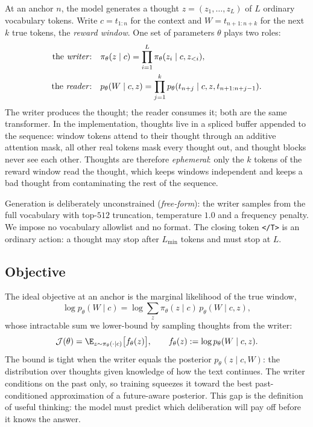 \documentclass{article} %
\newcommand{\ctx}{c}
\newcommand{\win}{W}
\newcommand{\thought}{z}
\newcommand{\policy}{\pi_\theta}
\newcommand{\reader}{p_\theta}
\newcommand{\tend}{\texttt{</T>}}
\begin{document}
At an anchor $n$, the model generates a thought $\thought = (\thought_1, \dots, \thought_L)$ of $L$ ordinary vocabulary tokens. Write $\ctx = t_{1:n}$ for the context and $\win = t_{n+1:n+k}$ for the next $k$ true tokens, the \emph{reward window}. One set of parameters $\theta$ plays two roles:
\begin{align}
    \text{the \emph{writer}:} \quad & \policy(\thought \mid \ctx) = \prod_{i=1}^{L} \policy(\thought_i \mid \ctx, \thought_{<i}), \\
    \text{the \emph{reader}:} \quad & \reader(\win \mid \ctx, \thought) = \prod_{j=1}^{k} \reader(t_{n+j} \mid \ctx, \thought, t_{n+1:n+j-1}).
\end{align}
The writer produces the thought; the reader consumes it; both are the same transformer. In the implementation, thoughts live in a spliced buffer appended to the sequence: window tokens attend to their thought through an additive attention mask, all other real tokens mask every thought out, and thought blocks never see each other. Thoughts are therefore \emph{ephemeral}: only the $k$ tokens of the reward window read the thought, which keeps windows independent and keeps a bad thought from contaminating the rest of the sequence.

Generation is deliberately unconstrained (\emph{free-form}): the writer samples from the full vocabulary with top-$512$ truncation, temperature $1.0$ and a frequency penalty. We impose no vocabulary allowlist and no format. The closing token \tend{} is an ordinary action: a thought may stop after $L_{\min}$ tokens and must stop at $L$.

\subsection{Objective}

The ideal objective at an anchor is the marginal likelihood of the true window,
\begin{equation}
    \log \reader(\win \mid \ctx) = \log \sum_{\thought} \policy(\thought \mid \ctx)\, \reader(\win \mid \ctx, \thought),
\end{equation}
whose intractable sum we lower-bound by sampling thoughts from the writer:
\begin{equation}
    \mathcal{J}(\theta) = \E_{\thought \sim \policy(\cdot \mid \ctx)} \big[ f_\theta(\thought) \big],
    \qquad
    f_\theta(\thought) := \log \reader(\win \mid \ctx, \thought).
    \label{eq:objective}
\end{equation}
The bound is tight when the writer equals the posterior $\reader(\thought \mid \ctx, \win)$: the distribution over thoughts given knowledge of how the text continues. The writer conditions on the past only, so training squeezes it toward the best past-conditioned approximation of a future-aware posterior. This gap is the definition of useful thinking: the model must predict which deliberation will pay off before it knows the answer.
\end{document}
